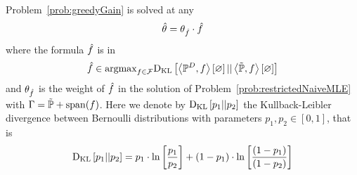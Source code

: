 \begin{theorem}
	Problem~\eqref{prob:greedyGain} is solved at any
	\begin{align*}
		\hat{\theta} = \theta_{\hat{f}} \cdot \hat{f}
	\end{align*}
	where the formula $\hat{f}$ is in
	\begin{align*}
		\hat{f} \in \mathrm{argmax}_{f\in\mathcal{F}} \mathrm{D}_{\mathrm{KL}}\left[ \left\langle \mathbb{P}^{D},f\right\rangle \left[ \varnothing \right] || \left\langle \tilde{\mathbb{P}},f\right\rangle \left[ \varnothing \right] \right]
	\end{align*}
	and $\theta_{\hat{f}}$ is the weight of $\hat{f}$ in the solution of Problem~\ref{prob:restrictedNaiveMLE} with $\Gamma = \tilde{\mathbb{P}} + \mathrm{span}(f)$.
	Here we denote by $\mathrm{D}_{\mathrm{KL}}\left[ p_1 || p_2 \right]$ the Kullback-Leibler divergence between Bernoulli distributions with parameters $p_1,p_2\in[0,1]$, that is
		\[ \mathrm{D}_{\mathrm{KL}}\left[ p_1 || p_2 \right] = p_1 \cdot \ln \left[ \frac{p_1}{p_2} \right] + (1-p_1) \cdot \ln \left[ \frac{(1-p_1)}{(1-p_2)} \right]  \]
\end{theorem}	
